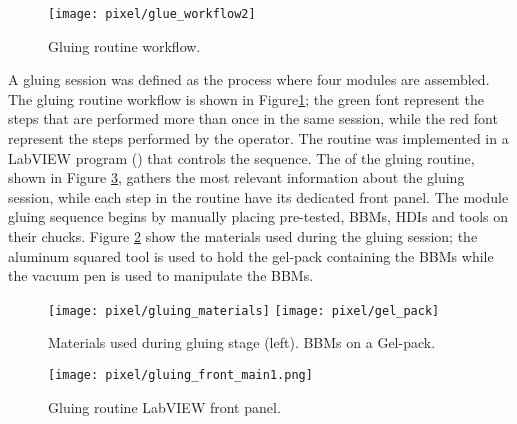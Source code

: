 \begin{figure}[h]
  \begin{center}
    \texttt{[image: pixel/glue\_workflow2]}
    \caption[Gluing routine workflow.]{Gluing routine workflow.}\label{fig:glue_workflow}
  \end{center}
\end{figure}

A gluing session was defined as the process where four modules are assembled. The gluing routine workflow is shown in Figure\ref{fig:glue_workflow}; the green font represent the steps that are performed more than once in the same session, while the red font represent the steps performed by the operator. The routine was implemented in a LabVIEW program () that controls the sequence. The  of the gluing routine, shown in Figure \ref{fig:gluing_front_main}, gathers the most relevant information about the gluing session, while each step in the routine have its dedicated front panel. The module gluing sequence begins by manually placing pre-tested, BBMs, HDIs and tools on their chucks. Figure \ref{fig:gluing_materials} show the materials used during the gluing session; the aluminum squared tool is used to hold the gel-pack containing the BBMs while the vacuum pen is used to manipulate the BBMs.

\begin{figure}[h]
\begin{center}
  \texttt{[image: pixel/gluing\_materials]}
  \texttt{[image: pixel/gel\_pack]}
 \caption[Materials used during gluing stage]{Materials used during gluing stage (left). BBMs on a Gel-pack.}\label{fig:gluing_materials}
\end{center}
\end{figure}

\begin{landscape}
\begin{figure}[h]
  \begin{center}
    \vspace{-2.5cm}
    \hspace{-1cm}
    \texttt{[image: pixel/gluing\_front\_main1.png]}
    \caption[Gluing routine LabVIEW front panel]{Gluing routine LabVIEW front panel.}\label{fig:gluing_front_main}
    \vspace{-2cm}
    \hspace{-2cm}
  \end{center}
\end{figure}
\end{landscape}


